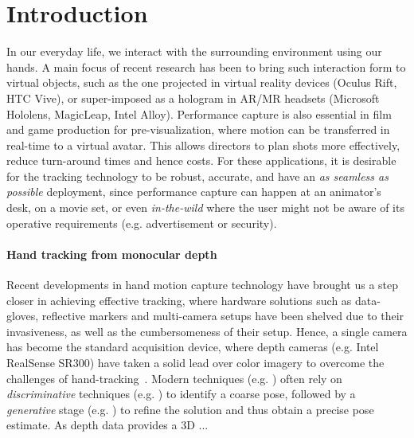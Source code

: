 \section{Introduction}
In our everyday life, we interact with the surrounding environment using our hands. A main focus of recent research has been to bring such interaction form to virtual objects, such as the one projected in virtual reality devices (Oculus Rift, HTC Vive), or super-imposed as a hologram in AR/MR headsets (Microsoft Hololens, MagicLeap, Intel Alloy). 
Performance capture is also essential in film and game production for pre-visualization, where motion can be transferred in real-time to a virtual avatar. This allows directors to plan shots more effectively, reduce turn-around times and hence costs.
For these applications, it is desirable for the tracking technology to be robust, accurate, and have an \emph{as seamless as possible} deployment, since performance capture can happen at an animator's desk, on a movie set, or even \emph{in-the-wild} where the user might not be aware of its operative requirements (e.g. advertisement or security).

\paragraph{Hand tracking from monocular depth}
Recent developments in hand motion capture technology have brought us a step closer in achieving effective tracking, where hardware solutions such as data-gloves, reflective markers and multi-camera setups have been shelved due to their invasiveness, as well as the cumbersomeness of their setup. 
Hence, a single camera has become the standard acquisition device, where depth cameras (e.g. Intel RealSense SR300) have taken a solid lead over color imagery to overcome the challenges of hand-tracking~\cite{supancic2015depth}. 
Modern techniques (e.g. \cite{taylor2016joint}) often rely on \emph{discriminative} techniques (e.g. \cite{valentin2016learning}) to identify a coarse pose, followed by a \emph{generative} stage (e.g. \cite{hmodel}) to refine the solution and thus obtain a precise pose estimate. 
As depth data provides a 3D ... 






